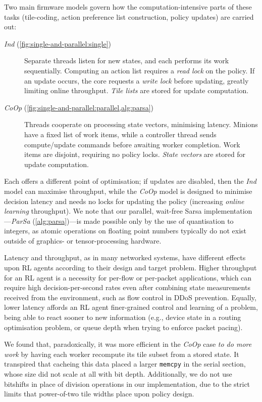 \documentclass[sigconf,natbib=false]{acmart}
\newcommand{\Coopfw}{\emph{CoOp}}
\newcommand{\coopfw}{\Coopfw}
\newcommand{\Indfw}{\emph{Ind}}
\newcommand{\indfw}{\Indfw}
\begin{document}
Two main firmware models govern how the computation-intensive parts of these tasks (tile-coding, action preference list construction, policy updates) are carried out:
\begin{description}
	\item[\Indfw{} (\cref{fig:single-and-parallel:single})] Separate threads listen for new states, and each performs its work sequentially. Computing an action list requires a \emph{read lock} on the policy. If an update occurs, the core requests a \emph{write lock} before updating, greatly limiting online throughput. \emph{Tile lists} are stored for update computation.
	\item[\Coopfw{} (\cref{fig:single-and-parallel:parallel,alg:parsa})] Threads cooperate on processing state vectors, minimising latency. Minions have a fixed list of work items, while a controller thread sends compute/update commands before awaiting worker completion. Work items are disjoint, requiring no policy locks. \emph{State vectors} are stored for update computation.
\end{description}
Each offers a different point of optimisation; if updates are disabled, then the \emph{\indfw{}} model can maximise throughput, while the \emph{\coopfw{}} model is designed to minimise decision latency and needs no locks for updating the policy (increasing \emph{online learning} throughput).
We note that our parallel, wait-free Sarsa implementation---\emph{ParSa} (\cref{alg:parsa})---is made possible only by the use of quantisation to integers, as atomic operations on floating point numbers typically do not exist outside of graphics- or tensor-processing hardware.

Latency and throughput, as in many networked systems, have different effects upon RL agents according to their design and target problem.
Higher throughput for an RL agent is a necessity for per-flow or per-packet applications, which can require high decision-per-second rates even after combining state measurements received from the environment, such as flow control in DDoS prevention.
Equally, lower latency affords an RL agent finer-grained control and learning of a problem, being able to react sooner to new information (e.g., device state in a routing optimisation problem, or queue depth when trying to enforce packet pacing).

We found that, paradoxically, it was more efficient in the \Coopfw{} case \emph{to do more work} by having each worker recompute its tile subset from a stored state.
It transpired that cacheing this data placed a larger \texttt{memcpy} in the serial section, whose size did not scale at all with bit depth.
Additionally, we do not use bitshifts in place of division operations in our implementation, due to the strict limits that power-of-two tile widths place upon policy design.
\end{document}
